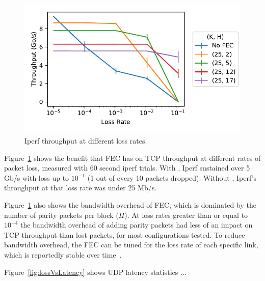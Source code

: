 \begin{figure}
  \centering
  \includegraphics[width=0.3\paperwidth]{figures/lossVsTput.pdf}
  \caption{\label{fig:lossVsTput} Iperf throughput at different loss rates.}
\end{figure}

Figure~\ref{fig:lossVsTput} shows the benefit that FEC has on TCP throughput
at different rates of packet loss, measured with 60 second iperf trials. With
\OurSys, Iperf sustained  over 5 Gb/s with loss up to $10^{-1}$ (1 out of
every 10 packets dropped). Without \OurSys, Iperf's throughput at that loss
rate was under 25 Mb/s.


Figure~\ref{fig:lossVsTput} also shows the bandwidth overhead of  FEC, which
is dominated by the number of parity packets per block ($H$).  At loss rates
greater than or equal to $10^{-4}$ the bandwidth overhead of adding  parity
packets had less of an impact on TCP throughput than lost packets, for  most
configurations tested. To reduce bandwidth overhead, the FEC  can be tuned for the
loss rate of each specific link, which is reportedly stable over
time~\cite{corropt}.


Figure~\ref{fig:lossVsLatency} shows UDP latency statistics ...

